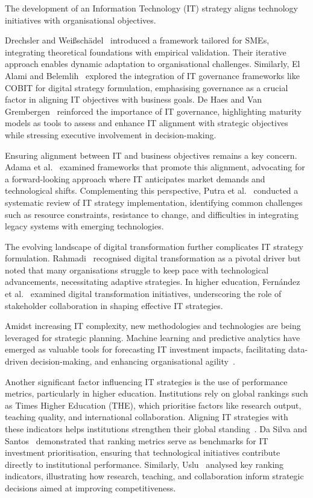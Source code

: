 \documentclass[conference]{IEEEtran}
\begin{document}
The development of an Information Technology (IT) strategy aligns technology initiatives with organisational objectives.

Drechsler and Weißschädel~\cite{drechsler2018framework} introduced a framework tailored for SMEs, integrating theoretical foundations with empirical validation. Their iterative approach enables dynamic adaptation to organisational challenges. Similarly, El Alami and Belemlih~\cite{elalami2021digital} explored the integration of IT governance frameworks like COBIT for digital strategy formulation, emphasising governance as a crucial factor in aligning IT objectives with business goals. De Haes and Van Grembergen~\cite{dehaes2009governance} reinforced the importance of IT governance, highlighting maturity models as tools to assess and enhance IT alignment with strategic objectives while stressing executive involvement in decision-making.

Ensuring alignment between IT and business objectives remains a key concern. Adama et al.~\cite{adama2024alignment} examined frameworks that promote this alignment, advocating for a forward-looking approach where IT anticipates market demands and technological shifts. Complementing this perspective, Putra et al.~\cite{putra2022trends} conducted a systematic review of IT strategy implementation, identifying common challenges such as resource constraints, resistance to change, and difficulties in integrating legacy systems with emerging technologies.

The evolving landscape of digital transformation further complicates IT strategy formulation. Rahmadi~\cite{rahmadi2024research} recognised digital transformation as a pivotal driver but noted that many organisations struggle to keep pace with technological advancements, necessitating adaptive strategies. In higher education, Fern\'andez et al.~\cite{fernandez2023digital} examined digital transformation initiatives, underscoring the role of stakeholder collaboration in shaping effective IT strategies.

Amidst increasing IT complexity, new methodologies and technologies are being leveraged for strategic planning. Machine learning and predictive analytics have emerged as valuable tools for forecasting IT investment impacts, facilitating data-driven decision-making, and enhancing organisational agility~\cite{digitalsystems2022strategy}.

Another significant factor influencing IT strategies is the use of performance metrics, particularly in higher education. Institutions rely on global rankings such as Times Higher Education (THE), which prioritise factors like research output, teaching quality, and international collaboration. Aligning IT strategies with these indicators helps institutions strengthen their global standing~\cite{times2023methodology}. Da Silva and Santos~\cite{dasilva2014cobit} demonstrated that ranking metrics serve as benchmarks for IT investment prioritisation, ensuring that technological initiatives contribute directly to institutional performance. Similarly, Uslu~\cite{uslu2020university} analysed key ranking indicators, illustrating how research, teaching, and collaboration inform strategic decisions aimed at improving competitiveness.
\end{document}
